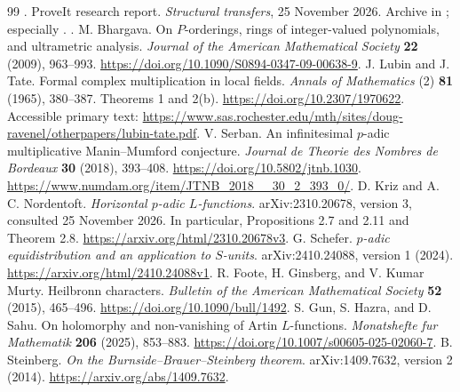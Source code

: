 \begin{thebibliography}{99}
.
ProveIt research report.
\emph{Structural transfers}, 25 November 2026.
Archive  in \cite{corpus};
especially .
.
M. Bhargava.
On \(P\)-orderings, rings of integer-valued polynomials, and ultrametric analysis.
\emph{Journal of the American Mathematical Society} \textbf{22} (2009), 963--993.
\url{https://doi.org/10.1090/S0894-0347-09-00638-9}.
J. Lubin and J. Tate.
Formal complex multiplication in local fields.
\emph{Annals of Mathematics} (2) \textbf{81} (1965), 380--387.
Theorems 1 and 2(b).
\url{https://doi.org/10.2307/1970622}.
Accessible primary text:
\url{https://www.sas.rochester.edu/mth/sites/doug-ravenel/otherpapers/lubin-tate.pdf}.
V. Serban.
An infinitesimal \(p\)-adic multiplicative Manin--Mumford conjecture.
\emph{Journal de Theorie des Nombres de Bordeaux} \textbf{30} (2018), 393--408.
\url{https://doi.org/10.5802/jtnb.1030}.
\url{https://www.numdam.org/item/JTNB_2018__30_2_393_0/}.
D. Kriz and A. C. Nordentoft.
\emph{Horizontal \(p\)-adic \(L\)-functions}.
arXiv:2310.20678, version 3, consulted 25 November 2026.
In particular, Propositions 2.7 and 2.11 and Theorem 2.8.
\url{https://arxiv.org/html/2310.20678v3}.
G. Schefer.
\emph{\(p\)-adic equidistribution and an application to \(S\)-units}.
arXiv:2410.24088, version 1 (2024).
\url{https://arxiv.org/html/2410.24088v1}.
R. Foote, H. Ginsberg, and V. Kumar Murty.
Heilbronn characters.
\emph{Bulletin of the American Mathematical Society} \textbf{52} (2015), 465--496.
\url{https://doi.org/10.1090/bull/1492}.
S. Gun, S. Hazra, and D. Sahu.
On holomorphy and non-vanishing of Artin \(L\)-functions.
\emph{Monatshefte fur Mathematik} \textbf{206} (2025), 853--883.
\url{https://doi.org/10.1007/s00605-025-02060-7}.
B. Steinberg.
\emph{On the Burnside--Brauer--Steinberg theorem}.
arXiv:1409.7632, version 2 (2014).
\url{https://arxiv.org/abs/1409.7632}.
\end{thebibliography}

